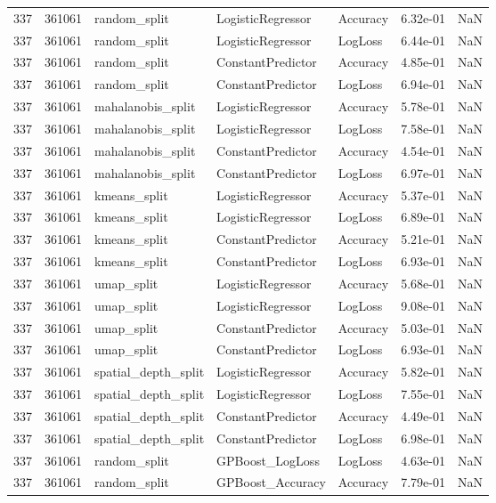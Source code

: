 \begin{tabular}{rrlllrr}
337 & 361061 & random\_split & LogisticRegressor & Accuracy & 6.32e-01 & NaN \\
337 & 361061 & random\_split & LogisticRegressor & LogLoss & 6.44e-01 & NaN \\
337 & 361061 & random\_split & ConstantPredictor & Accuracy & 4.85e-01 & NaN \\
337 & 361061 & random\_split & ConstantPredictor & LogLoss & 6.94e-01 & NaN \\
337 & 361061 & mahalanobis\_split & LogisticRegressor & Accuracy & 5.78e-01 & NaN \\
337 & 361061 & mahalanobis\_split & LogisticRegressor & LogLoss & 7.58e-01 & NaN \\
337 & 361061 & mahalanobis\_split & ConstantPredictor & Accuracy & 4.54e-01 & NaN \\
337 & 361061 & mahalanobis\_split & ConstantPredictor & LogLoss & 6.97e-01 & NaN \\
337 & 361061 & kmeans\_split & LogisticRegressor & Accuracy & 5.37e-01 & NaN \\
337 & 361061 & kmeans\_split & LogisticRegressor & LogLoss & 6.89e-01 & NaN \\
337 & 361061 & kmeans\_split & ConstantPredictor & Accuracy & 5.21e-01 & NaN \\
337 & 361061 & kmeans\_split & ConstantPredictor & LogLoss & 6.93e-01 & NaN \\
337 & 361061 & umap\_split & LogisticRegressor & Accuracy & 5.68e-01 & NaN \\
337 & 361061 & umap\_split & LogisticRegressor & LogLoss & 9.08e-01 & NaN \\
337 & 361061 & umap\_split & ConstantPredictor & Accuracy & 5.03e-01 & NaN \\
337 & 361061 & umap\_split & ConstantPredictor & LogLoss & 6.93e-01 & NaN \\
337 & 361061 & spatial\_depth\_split & LogisticRegressor & Accuracy & 5.82e-01 & NaN \\
337 & 361061 & spatial\_depth\_split & LogisticRegressor & LogLoss & 7.55e-01 & NaN \\
337 & 361061 & spatial\_depth\_split & ConstantPredictor & Accuracy & 4.49e-01 & NaN \\
337 & 361061 & spatial\_depth\_split & ConstantPredictor & LogLoss & 6.98e-01 & NaN \\
337 & 361061 & random\_split & GPBoost\_LogLoss & LogLoss & 4.63e-01 & NaN \\
337 & 361061 & random\_split & GPBoost\_Accuracy & Accuracy & 7.79e-01 & NaN \\

\end{tabular}
